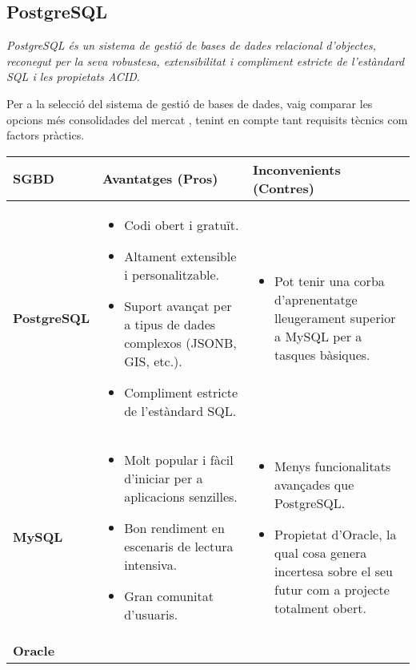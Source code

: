 \subsection{PostgreSQL}
\textit{PostgreSQL és un sistema de gestió de bases de dades relacional d'objectes, reconegut per la seva robustesa, extensibilitat i compliment estricte de l'estàndard SQL i les propietats ACID}.

Per a la selecció del sistema de gestió de bases de dades, vaig comparar les opcions més consolidades del mercat \cite{dbengines-comparison}, tenint en compte tant requisits tècnics com factors pràctics.

\begin{table}[h]
\centering
\begin{tabular}{|l|p{4.5cm}|p{4.5cm}|}
\hline
\textbf{SGBD} & \textbf{Avantatges (Pros)} & \textbf{Inconvenients (Contres)} \\
\hline
\textbf{PostgreSQL} & 
\begin{itemize}
    \item Codi obert i gratuït.
    \item Altament extensible i personalitzable.
    \item Suport avançat per a tipus de dades complexos (JSONB, GIS, etc.).
    \item Compliment estricte de l'estàndard SQL.
\end{itemize} & 
\begin{itemize}
    \item Pot tenir una corba d'aprenentatge lleugerament superior a MySQL per a tasques bàsiques.
\end{itemize} \\
\hline
\textbf{MySQL} & 
\begin{itemize}
    \item Molt popular i fàcil d'iniciar per a aplicacions senzilles.
    \item Bon rendiment en escenaris de lectura intensiva.
    \item Gran comunitat d'usuaris.
\end{itemize} & 
\begin{itemize}
    \item Menys funcionalitats avançades que PostgreSQL.
    \item Propietat d'Oracle, la qual cosa genera incertesa sobre el seu futur com a projecte totalment obert.
\end{itemize} \\
\hline
\textbf{Oracle} & 
\begin{itemize}

\end{itemize}
\end{tabular}
\end{table}
